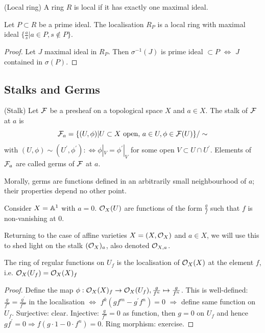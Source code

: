 \documentclass[a4paper,11pt]{article}
\begin{document}
			\begin{defi}(Local ring)
				A ring $R$ is local if it has exactly one maximal ideal.
			\end{defi}

			\begin{prop}
				Let $P\subset R$ be a prime ideal. The localisation $R_P$ is a local ring with maximal ideal $\{\frac{a}{s}|a\in P,s\notin P\}$.
			\end{prop}
			\begin{proof}
				Let $J$ maximal ideal in $R_P$. Then $\sigma^{-1}(J)$ is prime ideal $\subset P$ $\Longleftrightarrow$ $J$ contained in $\sigma(P)$.
			\end{proof}


		\subsection{Stalks and Germs}

			\begin{defi}
				(Stalk) Let $\F$ be a presheaf on a topological space $X$ and $a\in X$. The stalk of $\F$ at $a$ is 
				\begin{equation*}
					\F_a=\{(U,\phi)|U\subset X\text{ open, }a\in U,\phi\in\F(U)\}/\sim
				\end{equation*} 
				with $(U,\phi)\sim(U^\prime,\phi^\prime):\Longleftrightarrow\phi|_V=\phi^\prime|_V$ for some open $V\subset U\cap U^\prime$. Elements of $\F_a$ are called germs of $\F$ at $a$.
			\end{defi}

			\begin{remark}
				Morally, germs are functions defined in an arbitrarily small neighbourhood of $a$; their properties depend no other point.
			\end{remark}

			\begin{eg}
				Consider $X=\AA^1$ with $a=0$. $\O_X(U)$ are functions of the form $\frac{g}{f}$ such that $f$ is non-vanishing at $0$.
			\end{eg}

			Returning to the case of affine varieties $X=(X,\O_X)$ and $a\in X$, we will use this to shed light on the stalk $(\O_X)_a$, also denoted $\O_{X,a}$.

			\begin{prop}
				The ring of regular functions on $U_f$ is the localisation of $\O_X(X)$ at the element $f$, i.e. $\O_X(U_f)=\O_X(X)_f$
			\end{prop}
			\begin{proof}
				Define the map $\phi:\O_X(X)_f\rightarrow\O_X(U_f),\frac{g}{f^n}\mapsto\frac{g}{f^n}$. This is well-defined: $\frac{g}{f^n}=\frac{g^\prime}{f^m}$ in the localisation $\Longleftrightarrow$ $f^k(gf^m-g^\prime f^n)=0$ $\Longrightarrow$ define same function on $U_f$. Surjective: clear. Injective: $\frac{g}{f^n}=0$ as function, then $g=0$ on $U_f$ and hence $gf^\prime=0\Longrightarrow f(g\cdot1-0\cdot f^n)=0$. Ring morphism: exercise.
			\end{proof}
\end{document}
